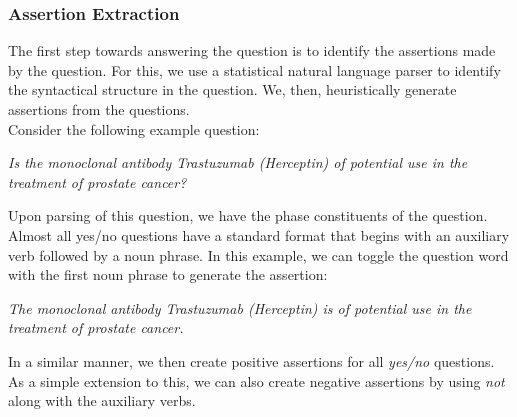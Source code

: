 \documentclass[11pt,a4paper]{article}
\begin{document}

\subsubsection{Assertion Extraction}

The first step towards answering the question is to identify the assertions made by the question. For this, we use a statistical natural language parser to identify the syntactical structure in the question. We, then, heuristically generate assertions from the questions.\\
Consider the following example question:

\textit{Is the monoclonal antibody Trastuzumab (Herceptin) of potential use in the treatment of prostate cancer?}

Upon parsing of this question, we have the phase constituents of the question. Almost all yes/no questions have a standard format that begins with an auxiliary verb followed by a noun phrase. In this example, we can toggle the question word with the first noun phrase to generate the assertion:

\textit{The monoclonal antibody Trastuzumab (Herceptin) is of potential use in the treatment of prostate cancer.}

In a similar manner, we then create positive assertions for all \textit{yes/no} questions. As a simple extension to this, we can also create negative assertions by using \textit{not} along with the auxiliary verbs.
\end{document}
